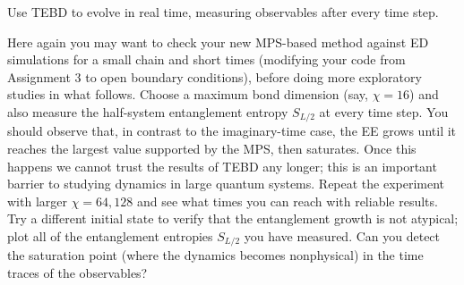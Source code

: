 \documentclass[12pt]{article}
\begin{document}
\newpage
Use TEBD to evolve in real time, measuring observables after every time step. 
\begin{figure}
  
\end{figure}
Here again you may want to check your new MPS-based method against ED simulations for a small chain and short times (modifying your code from Assignment 3 to open boundary conditions), before doing more exploratory studies in what follows. Choose a maximum bond dimension (say, $\chi=16$) and also measure the half-system entanglement entropy $S_{L/2}$ at every time step. You should observe that, in contrast to the imaginary-time case, the EE grows until it reaches the largest value supported by the MPS, then saturates. Once this happens we cannot trust the results of TEBD any longer; this is an important barrier to studying dynamics in large quantum systems. Repeat the experiment with larger $\chi=64,128$ and see what times you can reach with reliable results. Try a different initial state to verify that the entanglement growth is not atypical; plot all of the entanglement entropies $S_{L/2}$ you have measured. Can you detect the saturation point (where the dynamics becomes nonphysical) in the time traces of the observables?
\end{document}
